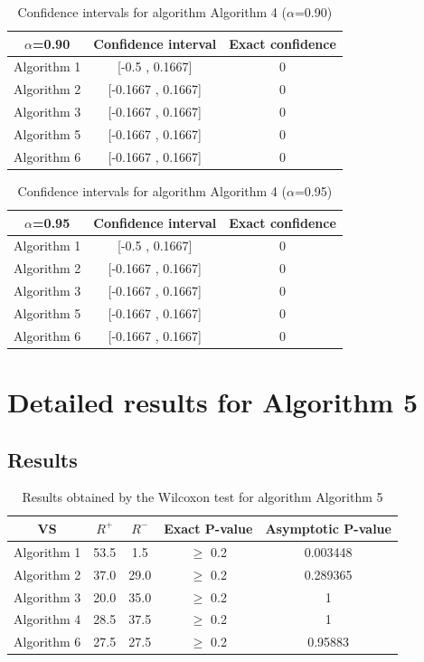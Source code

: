 \documentclass[a4paper,10pt]{article}
\begin{document}
\begin{table}[!htp]
\centering\small
\begin{tabular}{
|c|c|c|}
\hline
 $\alpha$=0.90 & Confidence interval & Exact confidence \\ \hline 
Algorithm 1 & [-0.5 , 0.1667] & 0\\ \hline 
Algorithm 2 & [-0.1667 , 0.1667] & 0\\ \hline 
Algorithm 3 & [-0.1667 , 0.1667] & 0\\ \hline 
Algorithm 5 & [-0.1667 , 0.1667] & 0\\ \hline 
Algorithm 6 & [-0.1667 , 0.1667] & 0\\ \hline 

\end{tabular}
\caption{Confidence intervals for algorithm Algorithm 4 ($\alpha$=0.90)}
\end{table}
\begin{table}[!htp]
\centering\small
\begin{tabular}{
|c|c|c|}
\hline
 $\alpha$=0.95 & Confidence interval & Exact confidence \\ \hline 
Algorithm 1 & [-0.5 , 0.1667] & 0\\ \hline 
Algorithm 2 & [-0.1667 , 0.1667] & 0\\ \hline 
Algorithm 3 & [-0.1667 , 0.1667] & 0\\ \hline 
Algorithm 5 & [-0.1667 , 0.1667] & 0\\ \hline 
Algorithm 6 & [-0.1667 , 0.1667] & 0\\ \hline 

\end{tabular}
\caption{Confidence intervals for algorithm Algorithm 4 ($\alpha$=0.95)}
\end{table}

 \clearpage 


\section{Detailed results for Algorithm 5}


\subsection{Results}

\begin{table}[!htp]
\centering\small
\begin{tabular}{
|c|c|c|c|c|}
\hline
 VS & $R^{+}$ & $R^{-}$ & Exact P-value & Asymptotic P-value \\ \hline 
Algorithm 1 & 53.5 & 1.5 & $\geq$ 0.2 & 0.003448\\ \hline 
Algorithm 2 & 37.0 & 29.0 & $\geq$ 0.2 & 0.289365\\ \hline 
Algorithm 3 & 20.0 & 35.0 & $\geq$ 0.2 & 1\\ \hline 
Algorithm 4 & 28.5 & 37.5 & $\geq$ 0.2 & 1\\ \hline 
Algorithm 6 & 27.5 & 27.5 & $\geq$ 0.2 & 0.95883\\ \hline 

\end{tabular}
\caption{Results obtained by the Wilcoxon test for algorithm Algorithm 5}
\end{table}
\end{document}
